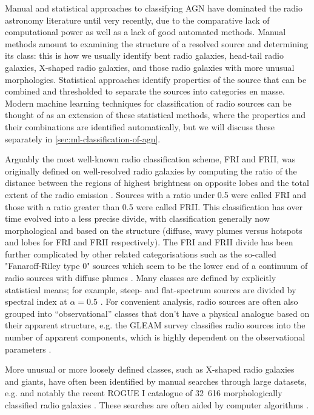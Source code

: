         Manual and statistical approaches to classifying AGN have dominated the radio astronomy literature until very recently, due to the comparative lack of computational power as well as a lack of good automated methods. Manual methods amount to examining the structure of a resolved source and determining its class: this is how we usually identify bent radio galaxies, head-tail radio galaxies, X-shaped radio galaxies, and those radio galaxies with more unusual morphologies. Statistical approaches identify properties of the source that can be combined and thresholded to separate the sources into categories en masse. Modern machine learning techniques for classification of radio sources can be thought of as an extension of these statistical methods, where the properties and their combinations are identified automatically, but we will discuss these separately in \autoref{sec:ml-classification-of-agn}.

        Arguably the most well-known radio classification scheme, FRI and FRII, was originally defined on well-resolved radio galaxies by computing the ratio of the distance between the regions of highest brightness on opposite lobes and the total extent of the radio emission \citep{Fanaroff1974}. Sources with a ratio under 0.5 were called FRI and those with a ratio greater than 0.5 were called FRII. This classification has over time evolved into a less precise divide, with classification generally now morphological and based on the structure (diffuse, wavy plumes versus hotspots and lobes for FRI and FRII respectively). The FRI and FRII divide has been further complicated by other related categorisations such as the so-called "Fanaroff-Riley type 0" sources which seem to be the lower end of a continuum of radio sources with diffuse plumes \citep{garofalo_fr0_2019,capetti_lofar_2020}. Many classes are defined by explicitly statistical means; for example, steep- and flat-spectrum sources are divided by spectral index at $\alpha = 0.5$ \citep{urry_unified_1995}. For convenient analysis, radio sources are often also grouped into ``observational'' classes that don't have a physical analogue based on their apparent structure, e.g. the GLEAM survey classifies radio sources into the number of apparent components, which is highly dependent on the observational parameters \citep{white_gleam_2020}.

        More unusual or more loosely defined classes, such as X-shaped radio galaxies and giants, have often been identified by manual searches through large datasets, e.g. \citet{cheung_first_2007,dabhade_search_2020} and notably the recent ROGUE I catalogue of 32~616 morphologically classified radio galaxies \citep{zywucka_catalogue_2020}. These searches are often aided by computer algorithms \citep[e.g.][]{proctor_morphological_2011,dabhade_search_2020}.

